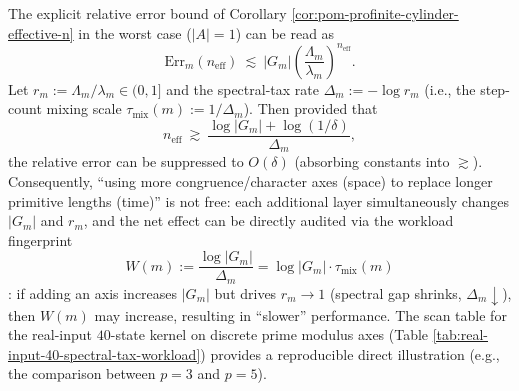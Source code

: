 \begin{remark}\label{rem:pom-spectral-tax-workload}
The explicit relative error bound of Corollary \ref{cor:pom-profinite-cylinder-effective-n} in the worst case (\(|A|=1\)) can be read as
\[
\mathrm{Err}_m(n_{\mathrm{eff}})\ \lesssim\ |G_m|\left(\frac{\Lambda_m}{\lambda_m}\right)^{n_{\mathrm{eff}}}.
\]
Let
\(
r_m:=\Lambda_m/\lambda_m\in(0,1]
\)
and the spectral-tax rate
\(
\Delta_m:=-\log r_m
\)
(i.e., the step-count mixing scale \(\tau_{\mathrm{mix}}(m):=1/\Delta_m\)).
Then provided that
\[
n_{\mathrm{eff}}\ \gtrsim\ \frac{\log|G_m|+\log(1/\delta)}{\Delta_m},
\]
the relative error can be suppressed to \(O(\delta)\) (absorbing constants into \(\gtrsim\)).
Consequently, ``using more congruence/character axes (space) to replace longer primitive lengths (time)'' is not free: each additional layer simultaneously changes
\(|G_m|\) and \(r_m\), and the net effect can be directly audited via the workload fingerprint
\[
W(m):=\frac{\log|G_m|}{\Delta_m}=\log|G_m|\cdot\tau_{\mathrm{mix}}(m)
\]
: if adding an axis increases \(|G_m|\) but drives \(r_m\to 1\) (spectral gap shrinks, \(\Delta_m\downarrow\)), then \(W(m)\) may increase, resulting in ``slower'' performance.
The scan table for the real-input \(40\)-state kernel on discrete prime modulus axes (Table \ref{tab:real-input-40-spectral-tax-workload}) provides a reproducible direct illustration (e.g., the comparison between \(p=3\) and \(p=5\)).
\end{remark}


